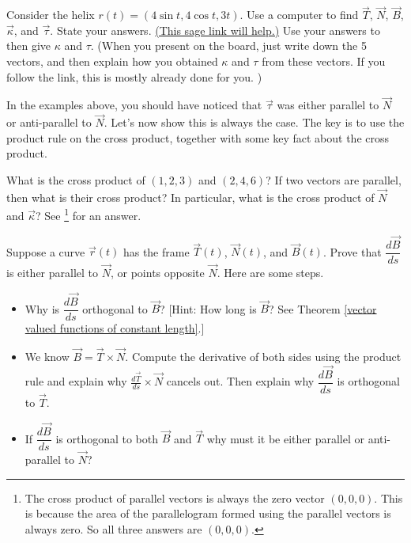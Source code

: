 \begin{problem}
 Consider the helix $r(t)=(4\sin t, 4\cos t, 3t)$. Use a computer to find $\vec T$, $\vec N$, $\vec B$, $\vec \kappa$, and $\vec \tau$. State your answers. \href{\sageurlforcurvature}{(This sage link will help.)} Use your answers to then give $\kappa$ and $\tau$. (When you present on the board, just write down the 5 vectors, and then explain how you obtained $\kappa$ and $\tau$ from these vectors. If you follow the link, this is mostly already done for you. )
\end{problem}

In the examples above, you should have noticed that $\vec \tau$ was either parallel to $\vec N$ or anti-parallel to $\vec N$.  Let's now show this is always the case. The key is to use the product rule on the cross product, together with some key fact about the cross product.
\begin{review*}
 What is the cross product of $(1,2,3)$ and $(2,4,6)$?  If two vectors are parallel, then what is their cross product?  In particular, what is the cross product of $\vec N$ and $\vec \kappa$? See \footnote{The cross product of parallel vectors is always the zero vector $(0,0,0)$. This is because the area of the parallelogram formed using the parallel vectors is always zero. So all three answers are $(0,0,0)$.} for an answer.
\end{review*}


\begin{problem}%
 Suppose a curve $\vec r(t)$ has the frame $\vec T(t)$, $\vec N(t)$, and $\vec B(t)$. Prove that $\dfrac{d\vec B}{ds}$ is either parallel to $\vec N$, or points opposite $\vec N$. Here are some steps.
 \begin{itemize}
  \item Why is $\dfrac{d\vec B}{ds}$ orthogonal to $\vec B$? [Hint: How long is $\vec B$? See Theorem \ref{vector valued functions of constant length}.]
  \item We know $\vec B=\vec T\times \vec N$. Compute the derivative of both sides using the product rule and explain why $\frac{d\vec T}{ds}\times \vec N$ cancels out. Then explain why $\dfrac{d\vec B}{ds}$ is orthogonal to $\vec T$.
  \item If $\dfrac{d\vec B}{ds}$ is orthogonal to both $\vec B$ and $\vec T$ why must it be either parallel or anti-parallel to $\vec N$?
 \end{itemize}
\end{problem}





